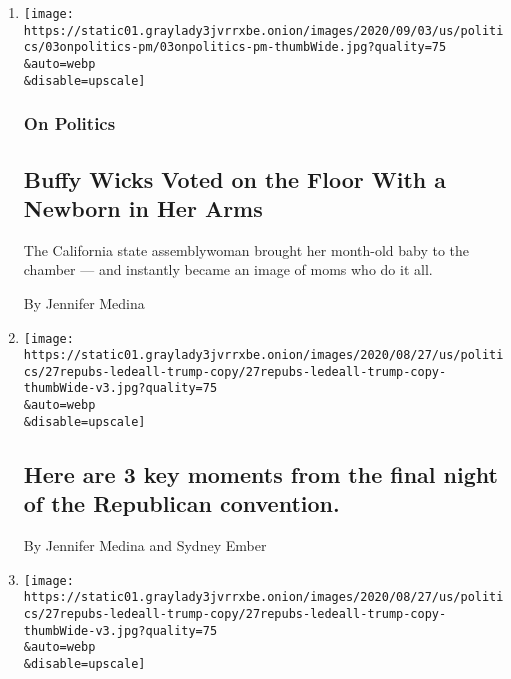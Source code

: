 \begin{enumerate}
\def\labelenumi{\arabic{enumi}.}
\item
  \href{/2020/09/03/us/politics/buffy-wicks-baby-california-assembly.html}{}

  \texttt{[image: https://static01.graylady3jvrrxbe.onion/images/2020/09/03/us/politics/03onpolitics-pm/03onpolitics-pm-thumbWide.jpg?quality=75\\\&auto=webp\\\&disable=upscale]}

  \hypertarget{on-politics}{%
  \subsubsection{On Politics}\label{on-politics}}

  \hypertarget{buffy-wicks-voted-on-the-floor-with-a-newborn-in-her-arms}{%
  \subsection{Buffy Wicks Voted on the Floor With a Newborn in Her
  Arms}\label{buffy-wicks-voted-on-the-floor-with-a-newborn-in-her-arms}}

  The California state assemblywoman brought her month-old baby to the
  chamber --- and instantly became an image of moms who do it all.

  By Jennifer Medina
\item
  \href{/2020/08/28/us/elections/here-are-3-key-moments-from-the-final-night-of-the-republican-convention.html}{}

  \texttt{[image: https://static01.graylady3jvrrxbe.onion/images/2020/08/27/us/politics/27repubs-ledeall-trump-copy/27repubs-ledeall-trump-copy-thumbWide-v3.jpg?quality=75\\\&auto=webp\\\&disable=upscale]}

  \hypertarget{here-are-3-key-moments-from-the-final-night-of-the-republican-convention}{%
  \subsection{Here are 3 key moments from the final night of the
  Republican
  convention.}\label{here-are-3-key-moments-from-the-final-night-of-the-republican-convention}}

  By Jennifer Medina and Sydney Ember
\item
  \href{/2020/08/28/us/politics/rnc-convention-speeches.html}{}

  \texttt{[image: https://static01.graylady3jvrrxbe.onion/images/2020/08/27/us/politics/27repubs-ledeall-trump-copy/27repubs-ledeall-trump-copy-thumbWide-v3.jpg?quality=75\\\&auto=webp\\\&disable=upscale]}


\end{enumerate}
